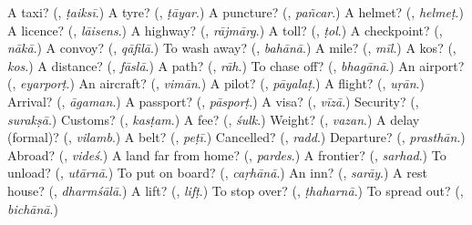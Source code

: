 \begin{tcolorbox}[breakable,colback=teal!4,colframe=teal!35!black,title={Before you move on}]
A taxi? (\textbf{}, \emph{ṭaiksī}.) A tyre? (\textbf{}, \emph{ṭāyar}.) A puncture? (\textbf{}, \emph{pañcar}.) A helmet? (\textbf{}, \emph{helmeṭ}.) A licence? (\textbf{}, \emph{lāisens}.) A highway? (\textbf{}, \emph{rājmārg}.) A toll? (\textbf{}, \emph{ṭol}.) A checkpoint? (\textbf{}, \emph{nākā}.) A convoy? (\textbf{}, \emph{qāfilā}.) To wash away? (\textbf{}, \emph{bahānā}.) A mile? (\textbf{}, \emph{mīl}.) A kos? (\textbf{}, \emph{kos}.) A distance? (\textbf{}, \emph{fāslā}.) A path? (\textbf{}, \emph{rāh}.) To chase off? (\textbf{}, \emph{bhagānā}.) An airport? (\textbf{}, \emph{eyarporṭ}.) An aircraft? (\textbf{}, \emph{vimān}.) A pilot? (\textbf{}, \emph{pāyalaṭ}.) A flight? (\textbf{}, \emph{uṛān}.) Arrival? (\textbf{}, \emph{āgaman}.) A passport? (\textbf{}, \emph{pāsporṭ}.) A visa? (\textbf{}, \emph{vīzā}.) Security? (\textbf{}, \emph{surakṣā}.) Customs? (\textbf{}, \emph{kasṭam}.) A fee? (\textbf{}, \emph{śulk}.) Weight? (\textbf{}, \emph{vazan}.) A delay (formal)? (\textbf{}, \emph{vilamb}.) A belt? (\textbf{}, \emph{peṭī}.) Cancelled? (\textbf{}, \emph{radd}.) Departure? (\textbf{}, \emph{prasthān}.) Abroad? (\textbf{}, \emph{videś}.) A land far from home? (\textbf{}, \emph{pardes}.) A frontier? (\textbf{}, \emph{sarhad}.) To unload? (\textbf{}, \emph{utārnā}.) To put on board? (\textbf{}, \emph{caṛhānā}.) An inn? (\textbf{}, \emph{sarāy}.) A rest house? (\textbf{}, \emph{dharmśālā}.) A lift? (\textbf{}, \emph{lifṭ}.) To stop over? (\textbf{}, \emph{ṭhaharnā}.) To spread out? (\textbf{}, \emph{bichānā}.)
\end{tcolorbox}

